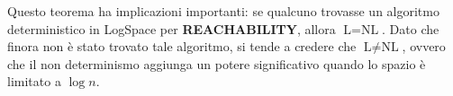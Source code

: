 \documentclass[a4paper]{article}
\begin{document}
Questo teorema ha implicazioni importanti: se qualcuno trovasse un algoritmo deterministico in LogSpace per \textbf{REACHABILITY}, allora $\text{L} = \text{NL}$. Dato che finora non è stato trovato tale algoritmo, si tende a credere che $\text{L} \ne \text{NL}$, ovvero che il non determinismo aggiunga un potere significativo quando lo spazio è limitato a $\log n$.
\end{document}
